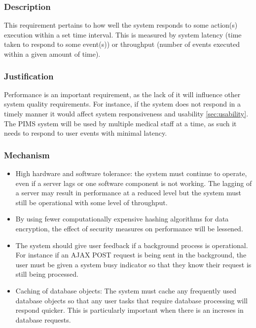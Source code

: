 \subsubsection*{Description}
This requirement pertains to how well the system responds to some action(s) execution within a set time interval. This is measured by system latency (time taken to respond to some event(s)) or throughput (number of events executed within a given amount of time).
		
\subsubsection*{Justification}
Performance is an important requirement, as the lack of it will influence other system quality requirements. For instance, if the system does not respond in a timely manner it would affect system responsiveness and usability \ref{sec:usability}. The PIMS system will be used by multiple medical staff at a time, as such it needs to respond to user events with minimal latency.
	
	
\subsubsection*{Mechanism}
	\begin{itemize}
		\item High hardware and software tolerance: the system must continue to operate, even if a server lags or one software component is not working. The lagging of a server may result in performance at a reduced level but the system must still be operational with some level of throughput.
		\item By using fewer computationally expensive hashing algorithms for data encryption, the effect of security measures on performance will be lessened.	 
		\item The system should give user feedback if a background process is operational. For instance if an AJAX POST request is being sent in the background, the user must be given a system busy indicator so that they know their request is still being processed.
		\item Caching of database objects: The system must cache any frequently used database objects so that any user tasks that require database processing will respond quicker. This is particularly important when there is an increses in database requests.
\end{itemize}


